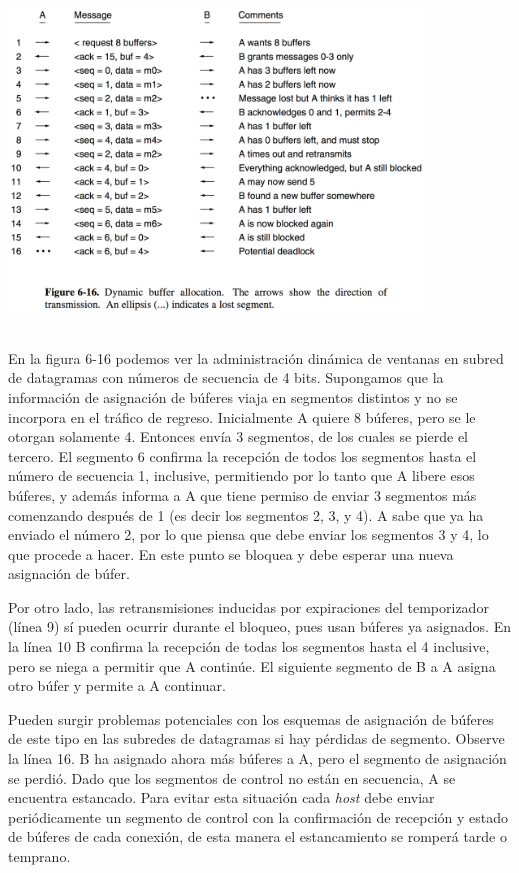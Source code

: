 \documentclass[10pt,a4paper]{report}
\begin{document}
	
	\begin{center} 
			\includegraphics[width=11cm, height=9cm]{./imagenes/flujo.png} 
	\end{center}

\par En la figura 6-16 podemos ver la administración dinámica de ventanas en subred de datagramas con números de secuencia de 4 bits. Supongamos que la información de asignación de búferes viaja en segmentos distintos y no se incorpora en el tráfico de regreso. Inicialmente A quiere 8 búferes, pero se le otorgan solamente 4. Entonces envía 3 segmentos, de los cuales se pierde el tercero. El segmento 6 confirma la recepción de todos los segmentos hasta el número de secuencia 1, inclusive, permitiendo por lo tanto que A libere esos búferes, y además informa a A que tiene permiso de enviar 3 segmentos más comenzando después de 1 (es decir los segmentos 2, 3, y 4). A sabe que ya ha enviado el número 2, por lo que piensa que debe enviar los segmentos 3 y 4, lo que procede a hacer. En este punto se bloquea y debe esperar una nueva asignación de búfer. 

	\par Por otro lado, las retransmisiones inducidas por expiraciones del temporizador (línea 9) sí pueden ocurrir durante el bloqueo, pues usan búferes ya asignados. En la línea 10 B confirma la recepción de todas los segmentos hasta el 4 inclusive, pero se niega a permitir que A continúe. El siguiente segmento de B a A asigna otro búfer y permite a A continuar.

	\par Pueden surgir problemas potenciales con los esquemas de asignación de búferes de este tipo en las subredes de datagramas si hay pérdidas de segmento. Observe la línea 16. B ha asignado ahora más búferes a A, pero el segmento de asignación se perdió. Dado que los segmentos de control no están en secuencia, A se encuentra estancado. Para evitar esta situación cada \textit{host} debe enviar periódicamente un segmento de control con la confirmación de recepción y estado de búferes de cada conexión, de esta manera el estancamiento se romperá tarde o temprano.
\end{document}
